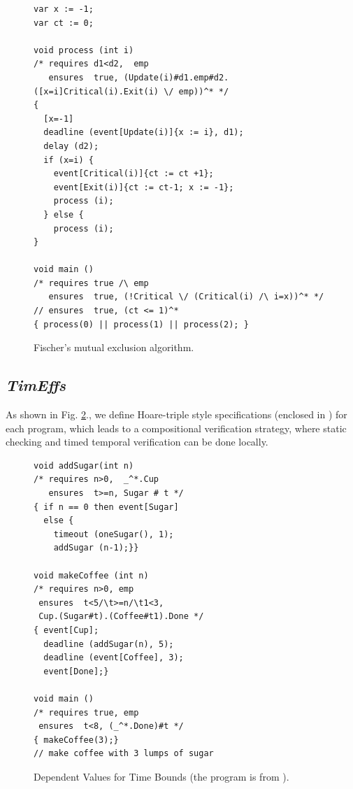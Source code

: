 \documentclass[acmsmall,10pt,review]{acmart}
\newcommand{\timedEffects}{\emph{TimEffs}}
\newcommand{\code}[1]{{\tt{\ensuremath{\m{#1}}}}}
\newcommand{\m}{\mathit}
\newcommand\figref[1]{Fig. \textcolor{black}{\ref{#1}}.}
\begin{document}
\begin{figure}[ht]
  \vspace{0mm}
\begin{lstlisting}[columns=fullflexible]
var x := -1; 
var ct := 0;

void process (int i)
/* requires d1<d2,  emp 
   ensures  true, (Update(i)#d1.emp#d2.([x=i]Critical(i).Exit(i) \/ emp))^* */
{
  [x=-1] 
  deadline (event[Update(i)]{x := i}, d1);
  delay (d2);
  if (x=i) {
    event[Critical(i)]{ct := ct +1};
    event[Exit(i)]{ct := ct-1; x := -1};
    process (i);
  } else {
    process (i);
}

void main () 
/* requires true /\ emp 
   ensures  true, (!Critical \/ (Critical(i) /\ i=x))^* */
// ensures  true, (ct <= 1)^*
{ process(0) || process(1) || process(2); }
\end{lstlisting}  
  \vspace{0mm}
  \caption{Fischer's mutual exclusion algorithm.}\label{fig:overview_ficher}
     \vspace{0mm}
\end{figure}





\subsection{\timedEffects}
As shown in \figref{fig:overview_eg1}, we define Hoare-triple style specifications (enclosed in \textcolor{darklavender}{}) for each program, which leads to a compositional verification strategy, where static checking and timed temporal verification can be done locally. %

\begin{figure}[ht]
      \vspace{0mm}
\begin{lstlisting}[columns=fullflexible]
void addSugar(int n)
/* requires n>0,  _^*.Cup 
   ensures  t>=n, Sugar # t */
{ if n == 0 then event[Sugar] 
  else {
    timeout (oneSugar(), 1);
    addSugar (n-1);}}
  
void makeCoffee (int n)
/* requires n>0, emp 
 ensures  t<5/\t>=n/\t1<3, 
 Cup.(Sugar#t).(Coffee#t1).Done */
{ event[Cup];
  deadline (addSugar(n), 5);
  deadline (event[Coffee], 3);
  event[Done];}
  
void main () 
/* requires true, emp 
 ensures  t<8, (_^*.Done)#t */
{ makeCoffee(3);}
// make coffee with 3 lumps of sugar

\end{lstlisting}  
      \vspace{0mm}
      \caption{Dependent Values for Time Bounds (the program is from  \cite{berry2020hiphop}).}\label{fig:overview_eg1}
         \vspace{0mm}
\end{figure}
\end{document}
